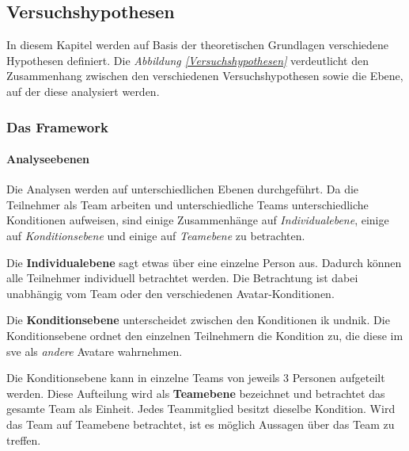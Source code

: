 \documentclass[a4paper,11pt]{article}%
\renewcommand{\\}{\vspace*{0.5\baselineskip} \newline}
\begin{document}
{\subsection{Versuchshypothesen}
In diesem Kapitel werden auf Basis der theoretischen Grundlagen verschiedene Hypothesen definiert.
Die \textit{Abbildung \ref{Versuchshypothesen}} verdeutlicht den Zusammenhang zwischen den verschiedenen Versuchshypothesen sowie die Ebene, auf der diese analysiert werden.
\subsubsection{Das Framework}

\paragraph{Analyseebenen}
Die Analysen werden auf unterschiedlichen Ebenen durchgeführt.
Da die Teilnehmer als Team arbeiten und unterschiedliche Teams unterschiedliche Konditionen aufweisen, sind einige Zusammenhänge auf \textit{Individualebene}, einige auf \textit{Konditionsebene} und einige auf \textit{Teamebene} zu betrachten.

Die \textbf{Individualebene} sagt etwas über eine einzelne Person aus. Dadurch können alle Teilnehmer individuell betrachtet werden. Die Betrachtung ist dabei unabhängig vom Team oder den verschiedenen Avatar-Konditionen. 

Die \textbf{Konditionsebene} unterscheidet zwischen den Konditionen \ac{ik} und\newline \ac{nik}. Die Konditionsebene ordnet den einzelnen Teilnehmern die Kondition zu, die diese im \ac{sve} als \textit{andere} Avatare wahrnehmen. 

Die Konditionsebene kann in einzelne Teams von jeweils 3 Personen aufgeteilt werden. Diese Aufteilung wird als \textbf{Teamebene} bezeichnet und betrachtet das gesamte Team als Einheit. Jedes Teammitglied besitzt dieselbe Kondition. Wird das Team auf Teamebene betrachtet, ist es möglich Aussagen über das Team zu treffen. 

}
\end{document}

